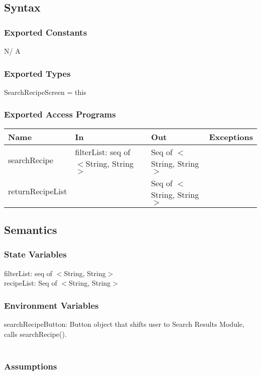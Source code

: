 \documentclass[12pt, titlepage]{article}
\begin{document}
\subsection{Syntax}

\subsubsection{Exported Constants}
N/ A
\subsubsection{Exported Types}
SearchRecipeScreen = this

\subsubsection{Exported Access Programs}

\begin{tabular}{| l | l | l | l |}
\hline
{\textbf{Name}} & {\textbf{In}} & {\textbf{Out}} & {\textbf{Exceptions}}\\
\hline
{searchRecipe} &filterList: seq of $<$String, String$>$ &Seq of  $<$String, String$>$ &\\
\hline
{returnRecipeList} &&Seq of  $<$String, String$>$ &\\
\hline
\end{tabular}

\subsection{Semantics}

\subsubsection{State Variables}
filterList: seq of $<$String, String$>$\\
recipeList: Seq of  $<$String, String$>$\\

\subsubsection{Environment Variables}

searchRecipeButton: Button object that shifts user to Search Results Module, calls searchRecipe().\\\\

\subsubsection{Assumptions}
\end{document}
